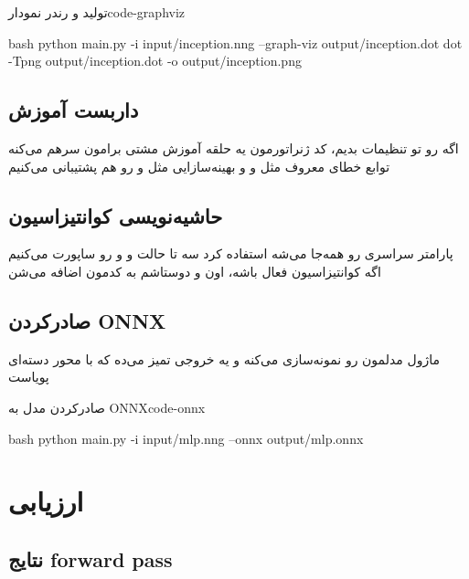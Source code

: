 \documentclass{nngraph-fa}
\begin{document}
\begin{codebox}{تولید و رندر نمودار}{code-graphviz}
\begin{amzcode}{bash}
python main.py -i input/inception.nng --graph-viz output/inception.dot
dot -Tpng output/inception.dot -o output/inception.png
\end{amzcode}
\end{codebox}

\section{داربست آموزش}

اگه  رو تو تنظیمات بدیم، کد ژنراتورمون یه حلقه آموزش مشتی برامون سرهم می‌کنه
توابع خطای معروف مثل  و  و بهینه‌سازایی مثل  و  رو هم پشتیبانی می‌کنیم

\section{حاشیه‌نویسی کوانتیزاسیون}

پارامتر سراسری  رو همه‌جا می‌شه استفاده کرد
سه تا حالت  و  و  رو ساپورت می‌کنیم
اگه کوانتیزاسیون فعال باشه، اون  و دوستاشم به کدمون اضافه می‌شن

\section{صادرکردن ONNX}

ماژول  مدلمون رو نمونه‌سازی می‌کنه و یه خروجی تمیز  می‌ده که با محور دسته‌ای پویاست

\begin{codebox}{صادرکردن مدل به ONNX}{code-onnx}
\begin{amzcode}{bash}
python main.py -i input/mlp.nng --onnx output/mlp.onnx
\end{amzcode}
\end{codebox}

\chapter{ارزیابی}



\section{نتایج forward pass}
\end{document}
